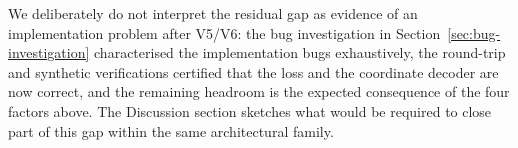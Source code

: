 We deliberately do not interpret the residual gap as evidence of an
implementation problem after V5/V6: the bug investigation in
Section~\ref{sec:bug-investigation} characterised the implementation bugs
exhaustively, the round-trip and synthetic verifications certified that the
loss and the coordinate decoder are now correct, and the remaining headroom
is the expected consequence of the four factors above. The Discussion section
sketches what would be required to close part of this gap within the same
architectural family.
